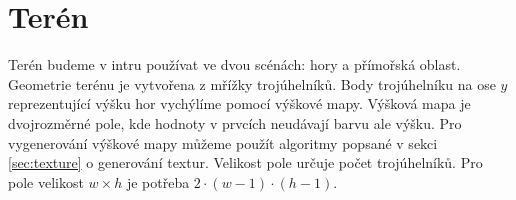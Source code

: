 
\section{Terén}

Terén budeme v intru používat ve dvou scénách: hory a přímořská oblast.
Geometrie terénu je vytvořena z mřížky trojúhelníků.
Body trojúhelníku na ose $y$ reprezentující výšku hor vychýlíme pomocí výškové mapy.
Výšková mapa je dvojrozměrné pole, kde hodnoty v prvcích neudávají barvu ale výšku.
Pro vygenerování výškové mapy můžeme použít algoritmy popsané v sekci \ref{sec:texture} o generování textur.
Velikost pole určuje počet trojúhelníků.
Pro pole velikost $w \times h$ je potřeba $2\cdot(w-1)\cdot(h-1)$.

